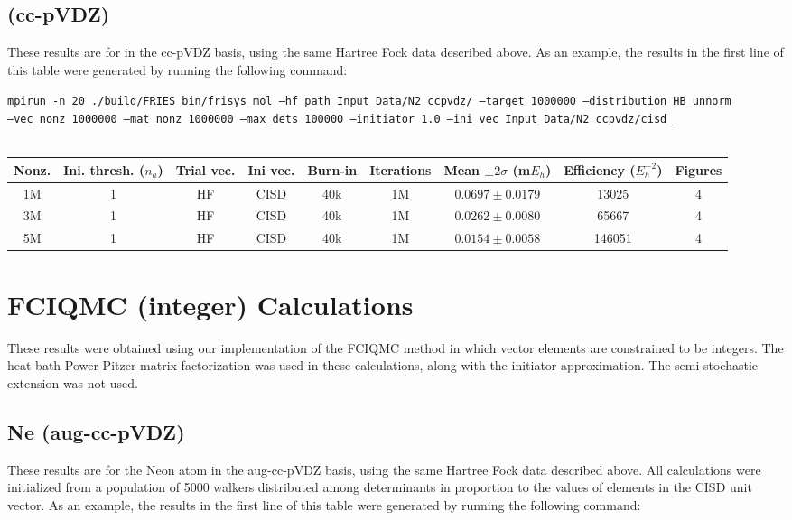 \documentclass[12pt, landscape]{article}
\begin{document}
\subsection*{ (cc-pVDZ)}
These results are for  in the cc-pVDZ basis, using the same Hartree Fock data described above. As an example, the results in the first line of this table were generated by running the following command:

\texttt{mpirun -n 20 ./build/FRIES\_bin/frisys\_mol --hf\_path Input\_Data/N2\_ccpvdz/ --target 1000000 --distribution HB\_unnorm}\\ \texttt{--vec\_nonz 1000000 --mat\_nonz 1000000 --max\_dets 100000 --initiator 1.0 --ini\_vec Input\_Data/N2\_ccpvdz/cisd\_}
\\~\\
\begin{tabular}{c|c|c|c|c|c|c|c|c}
Nonz. & Ini. thresh. ($n_a$) & Trial vec. & Ini vec. & Burn-in & Iterations & Mean $\pm 2 \sigma$ (m$E_h$) & Efficiency ($E_h^{-2}$) & Figures \\ \hline
1M & 1 & HF & CISD & 40k & 1M & $0.0697 \pm 0.0179$ & 13025 & 4\\
3M & 1 & HF & CISD & 40k & 1M & $0.0262 \pm 0.0080$ & 65667 & 4\\
5M & 1 & HF & CISD & 40k & 1M & $0.0154 \pm 0.0058$ & 146051 & 4\\
\end{tabular}

\section*{FCIQMC (integer) Calculations}
These results were obtained using our implementation of the FCIQMC method in which vector elements are constrained to be integers. The heat-bath Power-Pitzer matrix factorization was used in these calculations, along with the initiator approximation. The semi-stochastic extension was not used.

\subsection*{Ne (aug-cc-pVDZ)}
These results are for the Neon atom in the aug-cc-pVDZ basis, using the same Hartree Fock data described above. All calculations were initialized from a population of 5000 walkers distributed among determinants in proportion to the values of elements in the CISD unit vector. As an example, the results in the first line of this table were generated by running the following command:
\end{document}
